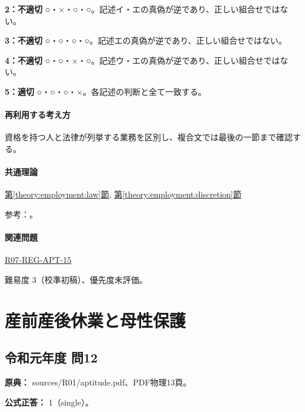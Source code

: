 \noindent\textbf{2：不適切} ○・×・○・○。記述イ・エの真偽が逆であり、正しい組合せではない。\par

\noindent\textbf{3：不適切} ○・○・○・○。記述エの真偽が逆であり、正しい組合せではない。\par

\noindent\textbf{4：不適切} ○・○・×・○。記述ウ・エの真偽が逆であり、正しい組合せではない。\par

\noindent\textbf{5：適切} ○・○・○・×。各記述の判断と全て一致する。\par

\paragraph{再利用する考え方} 資格を持つ人と法律が列挙する業務を区別し、複合文では最後の一節まで確認する。

\paragraph{共通理論} \hyperref[theory:employment:law]{第\ref*{theory:employment:law}節}, \hyperref[theory:employment:discretion]{第\ref*{theory:employment:discretion}節}

\par 参考：\cite{employment_discretion2014,employment_discretion_current,employment_industrial_physician,employment_labor_three,employment_overtime}。

\paragraph{関連問題} \hyperref[q:r07-reg-apt-15]{R07-REG-APT-15}

\par 難易度 3（校準初稿）、優先度未評価。

\section{産前産後休業と母性保護}

\subsection{令和元年度 問12}
\label{q:r01-reg-apt-12}

\noindent\textbf{原典：} sources/R01/aptitude.pdf、PDF物理13頁。

\textbf{公式正答：} 1（single）。

